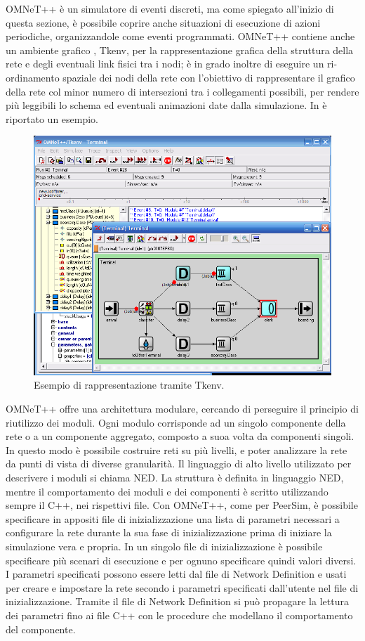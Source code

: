OMNeT++ è un simulatore di eventi discreti, ma come spiegato all'inizio di questa sezione, è possibile coprire anche situazioni di esecuzione di azioni periodiche, organizzandole come eventi programmati. OMNeT++ contiene anche un ambiente grafico \cite{omnet2002-overview}, Tkenv, per la rappresentazione grafica della struttura della rete e degli eventuali link fisici tra i nodi; è in grado inoltre di eseguire un ri-ordinamento spaziale dei nodi della rete con l’obiettivo di rappresentare il grafico della rete col minor numero di intersezioni tra i collegamenti possibili, per rendere più leggibili lo schema ed eventuali animazioni date dalla simulazione. In  è riportato un esempio.
\begin{figure}[tb]
\centering
\includegraphics[width=0.7\linewidth]{Images/omnet/tkenv_01}
\caption[tkenv]{Esempio di rappresentazione tramite Tkenv.}
\label{fig:tkenv_01}
\end{figure}
OMNeT++ offre una architettura modulare, cercando di perseguire il principio di riutilizzo dei moduli\cite{omnet2002-overview}. Ogni modulo corrisponde ad un singolo componente della rete o a un componente aggregato, composto a suoa volta da componenti singoli. In questo modo è possibile costruire reti su più livelli, e poter analizzare la rete da punti di vista di diverse granularità. Il linguaggio di alto livello utilizzato per descrivere i moduli si chiama \acf{NED}. La struttura è definita in linguaggio \acs{NED}, mentre il comportamento dei moduli e dei componenti è scritto utilizzando sempre il C++, nei rispettivi file. 
Con OMNeT++, come per PeerSim,  è possibile specificare in appositi file di inizializzazione una lista di parametri necessari a configurare la rete durante la sua fase di inizializzazione prima di iniziare la simulazione vera e propria.  In un singolo file di inizializzazione è possibile specificare più scenari di esecuzione e per ognuno specificare quindi valori diversi. I parametri specificati possono essere letti dal file di Network Definition e usati per creare e impostare la rete secondo i parametri specificati dall’utente nel file di inizializzazione. Tramite il file di Network Definition si può propagare la lettura dei parametri fino ai file C++ con le procedure che modellano il comportamento del componente.
